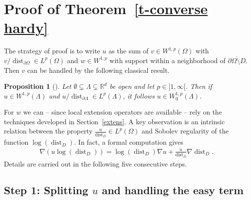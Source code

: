 \documentclass[10pt,leqno]{amsart}
\newtheorem{proposition}[theorem]{Proposition}
\theoremstyle{definition}
\numberwithin{equation}{section}
\begin{document}
\section{Proof of Theorem~\ref{t-converse hardy}}\label{sec-conv-hardy}
\noindent The strategy of proof is to write $u$ as the sum of $v \in
W^{1,p}(\Omega)$ with $v/{\operatorname{dist}}_{\partial \Omega} \in L^p(\Omega)$ and $w \in
W^{1,p}$ with support within a neighborhood of $\overline{\partial \Omega
\setminus D}$. Then $v$ can be handled by the following classical result.

\begin{proposition}[{\cite[Thm.~V.3.4]{ed/ev}}]\label{p-hardy_implies_W1p0}
Let $\emptyset \subsetneq \Lambda \subsetneq {{\mathbb R}}^d$ be open and
let $p\in {]1,\infty[}$. Then if $u \in W^{1,p}(\Lambda)$ and
$u/{\operatorname{dist}}_{\partial \Lambda} \in L^p(\Lambda)$, it follows $u \in
W_0^{1,p}(\Lambda)$. 
\end{proposition}

\noindent For $w$ we can -- since local extension operators are available --
rely on the techniques developed in Section~\ref{extens}. A key observation is
an intrinsic relation between the property $\frac{u}{{\operatorname{dist}}_D} \in L^p(\Omega)$
and Sobolev regularity of the function $\log({\operatorname{dist}}_D)$. In fact, a formal
computation gives
\begin{align*}
 \nabla (u \log({\operatorname{dist}}_D)) = \log({\operatorname{dist}}_D) \nabla u + \frac{u}{{\operatorname{dist}}_D} \nabla
{\operatorname{dist}}_D.
\end{align*}
Details are carried out in the following five consecutive
steps.

\subsection*{Step 1: Splitting $u$ and handling the easy term}
\end{document}
